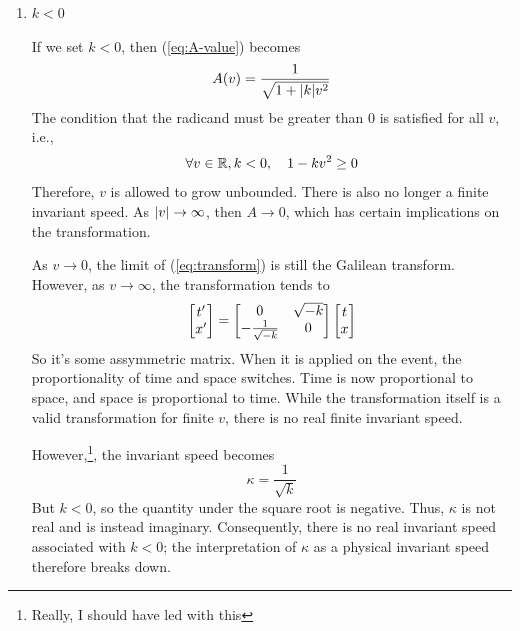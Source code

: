 \documentclass[12pt,a4paper]{article}
\begin{document}
\begin{solution_pset}
\begin{enumerate}[(1)]
				This is precisely the classical Galilean transformations.
				Thus, when we set $k=0$, we recover the Galilean transformation,
				where the invariant speed is pushed to infinity, 
				and there is no finite invariant speed.

				This is a \textbf{valid option}, and is in fact the assumption
				adopted by Newtonian and other classical mechanics theories.
				\newpage

			\item $k < 0$

				If we set $k<0$, then (\ref{eq:A-value}) becomes
				\begin{equation}
					\label{eq:A-transform-k<0}
					A(v) = \frac{1}{\sqrt{1+\abs{k}v^2}} 
				\end{equation}
				The condition that the radicand must be greater than 0 is
				satisfied for all $v$, i.e.,
				\[
					\forall v \in \mathbb{R}, k<0, \quad 1 - k v^2 \geq 0
				\]
				Therefore, $v$ is allowed to grow unbounded.  
				There is also no longer a finite invariant speed.
				As $\abs{v}\to\infty$, then
				$A\to 0$, which has certain implications on the transformation.

				As $v\to 0$, the limit of (\ref{eq:transform}) is still 
				the Galilean transform. However, as $v\to\infty$, the transformation
				tends to
				\begin{equation}
					\label{eq:transform-k<0}
				    \bmqty{
				    	t'\\x'
				    } 
					=
					\bmqty{
						0 & \sqrt{-k} \\
						-\frac{1}{\sqrt{-k}} & 0
					} 
					\bmqty{
						t\\x
					} 
				\end{equation}
				So it's some assymmetric matrix. When it is
				applied on the event, the proportionality of time and space switches.
				Time is now proportional to space, and space is proportional to time.
				While the transformation itself is a valid transformation for finite $v$,
				there is no real finite invariant speed.
				
				However,\footnote{Really, I should have led with this}, the invariant speed
				becomes 
				\[
					\kappa = \frac{1}{\sqrt{k}} 
				\]
				But $k<0$, so the quantity under the square root is negative.
				Thus, $\kappa$ is not real and is instead imaginary.
				Consequently, there is no real invariant speed associated with
				$k<0$; the interpretation of $\kappa$ as a physical invariant
				speed therefore breaks down.


\end{enumerate}
\end{solution_pset}
\end{document}
